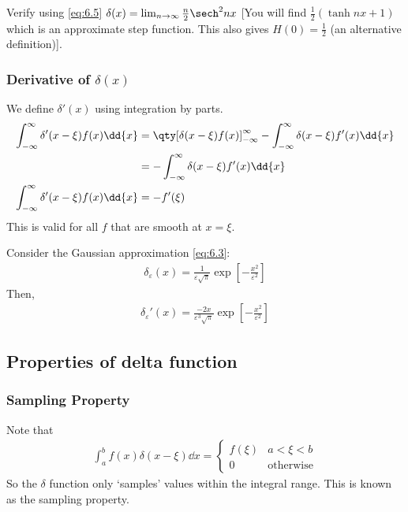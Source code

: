 \begin{exercise}
	Verify using \cref{eq:6.5} $\delta(x) = \lim_{n \to \infty} \frac{n}{2} \sech^2 nx$ [You will find $\frac{1}{2} (\tanh nx + 1)$ which is an approximate step function. This also gives $H(0) = \frac{1}{2}$ (an alternative definition)].
\end{exercise} 

\subsubsection{Derivative of $\delta(x)$}
We define $\delta'(x)$ using integration by parts.
\begin{align}
	\int_{-\infty}^\infty \delta'(x-\xi) f(x) \dd{x} &= \qty[\delta(x-\xi) f(x)]_{-\infty}^\infty - \int_{-\infty}^\infty \delta(x-\xi) f'(x) \dd{x} \notag \\
    &= - \int_{-\infty}^\infty \delta(x-\xi) f'(x) \dd{x} \notag \\
    \int_{-\infty}^\infty \delta'(x-\xi) f(x) \dd{x} &= - f'(\xi) \label{eq:6.8}
\end{align}
This is valid for all $f$ that are smooth at $x = \xi$.
\begin{example}
	Consider the Gaussian approximation \cref{eq:6.3}:
	\begin{align*}
		\delta_\varepsilon(x) = \frac{1}{\varepsilon \sqrt{\pi}} \exp[-\frac{x^2}{\varepsilon^2}]
	\end{align*}
	Then,
	\begin{align*}
		\delta_\varepsilon'(x) = \frac{-2x}{\varepsilon^3 \sqrt{\pi}} \exp[-\frac{x^2}{\varepsilon^2}]
	\end{align*}

	\begingroup
	\begin{center}
		
	\end{center} 
	\endgroup
\end{example}

\subsection{Properties of delta function}
\subsubsection{Sampling Property}
Note that
\begin{align} \label{eq:6.9}
	\int_a^b f(x) \delta(x-\xi) \dd{x} = \begin{cases}
		f(\xi) & a < \xi < b \\
		0 & \text{otherwise}
	\end{cases}
\end{align}
So the $\delta$ function only `samples' values within the integral range.
This is known as the sampling property.

